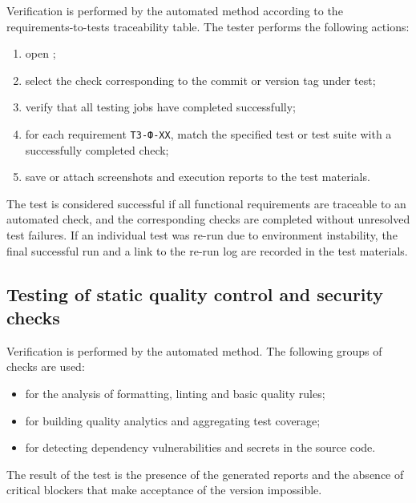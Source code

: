 \documentclass[12pt,a4paper]{extarticle}
\begin{document}
\begin{hseExample}
Verification is performed by the automated method according to the requirements-to-tests traceability table. The tester performs the following actions:

\begin{enumerate}[label=\arabic*), leftmargin=1.25cm]
    \item open ;
    \item select the check corresponding to the commit or version tag under test;
    \item verify that all testing jobs have completed successfully;
    \item for each requirement \texttt{ТЗ-Ф-XX}, match the specified test or test suite with a successfully completed check;
    \item save or attach screenshots and execution reports to the test materials.
\end{enumerate}

The test is considered successful if all functional requirements are traceable to an automated check, and the corresponding checks are completed without unresolved test failures. If an individual test was re-run due to environment instability, the final successful run and a link to the re-run log are recorded in the test materials.
\end{hseExample}

\subsection{Testing of static quality control and security checks}

\begin{hseExample}
Verification is performed by the automated method. The following groups of checks are used:

\begin{itemize}[leftmargin=1.25cm]
    \item {} for the analysis of formatting, linting and basic quality rules;
    \item {} for building quality analytics and aggregating test coverage;
    \item {} for detecting dependency vulnerabilities and secrets in the source code.
\end{itemize}

The result of the test is the presence of the generated reports and the absence of critical blockers that make acceptance of the version impossible.
\end{hseExample}
\end{document}
